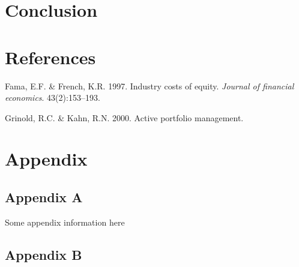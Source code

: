 \documentclass[11pt,preprint, authoryear]{elsarticle}
\numberwithin{equation}{section}
\numberwithin{figure}{section}
\numberwithin{table}{section}
\newlength{\cslhangindent}
\newenvironment{CSLReferences}%
  {\setlength{\parindent}{0pt}%
  \everypar{\setlength{\hangindent}{\cslhangindent}}\ignorespaces}%
  {\par}
\begin{document}
\hypertarget{conclusion}{%
\section{Conclusion}\label{conclusion}}

\newpage

\hypertarget{references}{%
\section*{References}\label{references}}

\hypertarget{refs}{}
\begin{CSLReferences}{1}{0}
\leavevmode\hypertarget{ref-fama1997}{}%
Fama, E.F. \& French, K.R. 1997. Industry costs of equity. \emph{Journal
of financial economics}. 43(2):153--193.

\leavevmode\hypertarget{ref-grinold2000}{}%
Grinold, R.C. \& Kahn, R.N. 2000. Active portfolio management.

\end{CSLReferences}

\hypertarget{appendix}{%
\section*{Appendix}\label{appendix}}

\hypertarget{appendix-a}{%
\subsection*{Appendix A}\label{appendix-a}}

Some appendix information here

\hypertarget{appendix-b}{%
\subsection*{Appendix B}\label{appendix-b}}


\end{document}
